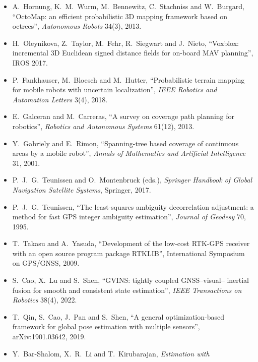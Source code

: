 \begin{description}[leftmargin=1.5em,style=nextline,font=\normalfont]
\begin{itemize}[nosep]
  mutual information'', \emph{IEEE Transactions on Pattern Analysis and
  Machine Intelligence} 30(2), 2008.
\item A.~Hornung, K.~M.~Wurm, M.~Bennewitz, C.~Stachniss and W.~Burgard,
  ``OctoMap: an efficient probabilistic 3D mapping framework based on
  octrees'', \emph{Autonomous Robots} 34(3), 2013.
\item H.~Oleynikova, Z.~Taylor, M.~Fehr, R.~Siegwart and J.~Nieto,
  ``Voxblox: incremental 3D Euclidean signed distance fields for on-board
  MAV planning'', IROS 2017.
\item P.~Fankhauser, M.~Bloesch and M.~Hutter, ``Probabilistic terrain
  mapping for mobile robots with uncertain localization'', \emph{IEEE
  Robotics and Automation Letters} 3(4), 2018.
\item E.~Galceran and M.~Carreras, ``A survey on coverage path planning
  for robotics'', \emph{Robotics and Autonomous Systems} 61(12), 2013.
\item Y.~Gabriely and E.~Rimon, ``Spanning-tree based coverage of
  continuous areas by a mobile robot'', \emph{Annals of Mathematics and
  Artificial Intelligence} 31, 2001.
\end{itemize}
\item[GNSS and multi-sensor fusion]
\begin{itemize}[nosep]
\item P.~J.~G.~Teunissen and O.~Montenbruck (eds.), \emph{Springer
  Handbook of Global Navigation Satellite Systems}, Springer, 2017.
\item P.~J.~G.~Teunissen, ``The least-squares ambiguity decorrelation
  adjustment: a method for fast GPS integer ambiguity estimation'',
  \emph{Journal of Geodesy} 70, 1995.
\item T.~Takasu and A.~Yasuda, ``Development of the low-cost RTK-GPS
  receiver with an open source program package RTKLIB'', International
  Symposium on GPS/GNSS, 2009.
\item S.~Cao, X.~Lu and S.~Shen, ``GVINS: tightly coupled GNSS--visual--%
inertial fusion for smooth and consistent state estimation'',
  \emph{IEEE Transactions on Robotics} 38(4), 2022.
\item T.~Qin, S.~Cao, J.~Pan and S.~Shen, ``A general optimization-based
  framework for global pose estimation with multiple sensors'',
  arXiv:1901.03642, 2019.
\end{itemize}
\item[Evaluation and consistency]
\begin{itemize}[nosep]
\item Y.~Bar-Shalom, X.~R.~Li and T.~Kirubarajan, \emph{Estimation with
}
\end{itemize}
\end{description}
